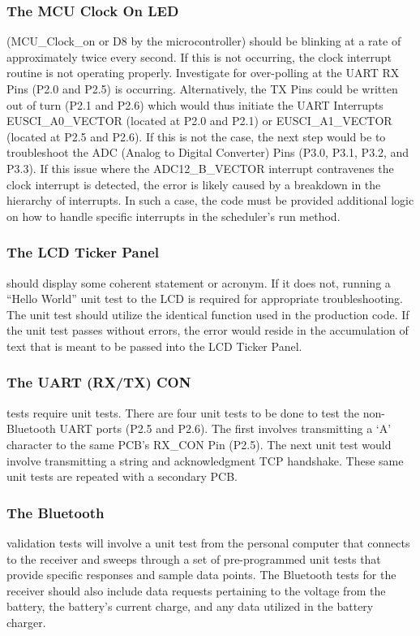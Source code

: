 \documentclass[12pt]{article}
\begin{document}
\subsubsection*{The MCU Clock On LED} (MCU\_Clock\_on or D8 by the microcontroller) should be blinking at a rate of approximately twice every second.  If this is not occurring, the clock interrupt routine is not operating properly.  Investigate for over-polling at the UART RX Pins (P2.0 and P2.5) is occurring.  Alternatively, the TX Pins could be written out of turn (P2.1 and P2.6) which would thus initiate the UART Interrupts EUSCI\_A0\_VECTOR (located at P2.0 and P2.1) or EUSCI\_A1\_VECTOR (located at P2.5 and P2.6).  If this is not the case, the next step would be to troubleshoot the ADC (Analog to Digital Converter) Pins (P3.0, P3.1, P3.2, and P3.3).  If this issue where the ADC12\_B\_VECTOR interrupt contravenes the clock interrupt is detected, the error is likely caused by a breakdown in the hierarchy of interrupts.  In such a case, the code must be provided additional logic on how to handle specific interrupts in the scheduler’s run method.

\subsubsection*{The LCD Ticker Panel} should display some coherent statement or acronym.  If it does not, running a “Hello World” unit test to the LCD is required for appropriate troubleshooting.  The unit test should utilize the identical function used in the production code.  If the unit test passes without errors, the error would reside in the accumulation of text that is meant to be passed into the LCD Ticker Panel.

\subsubsection*{The UART (RX/TX) CON} tests require unit tests. There are four unit tests to be done to test the non-Bluetooth UART ports (P2.5 and P2.6).  The first involves transmitting a ‘A’ character to the same PCB’s RX\_CON Pin (P2.5).  The next unit test would involve transmitting a string and acknowledgment TCP handshake.  These same unit tests are repeated with a secondary PCB.

\subsubsection*{The Bluetooth} validation tests will involve a unit test from the personal computer that connects to the receiver and sweeps through a set of pre-programmed unit tests that provide specific responses and sample data points.  The Bluetooth tests for the receiver should also include data requests pertaining to the voltage from the battery, the battery's current charge, and any data utilized in the battery charger.\hfill
\end{document}
